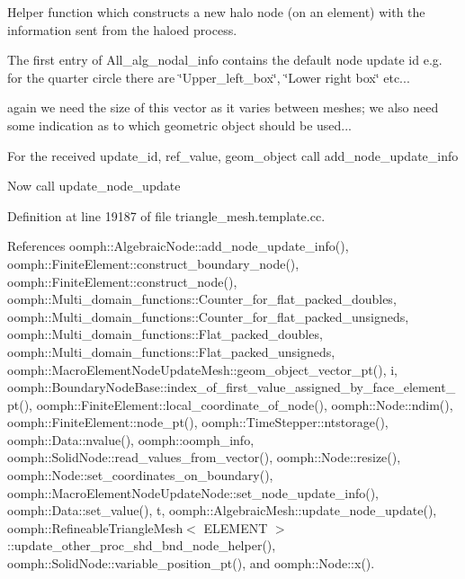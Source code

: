 Helper function which constructs a new halo node (on an element) with the information sent from the haloed process. 

The first entry of All\+\_\+alg\+\_\+nodal\+\_\+info contains the default node update id e.\+g. for the quarter circle there are \char`\"{}\+Upper\+\_\+left\+\_\+box\char`\"{}, \char`\"{}\+Lower right box\char`\"{} etc...

again we need the size of this vector as it varies between meshes; we also need some indication as to which geometric object should be used...

For the received update\+\_\+id, ref\+\_\+value, geom\+\_\+object call add\+\_\+node\+\_\+update\+\_\+info

Now call update\+\_\+node\+\_\+update 

Definition at line 19187 of file triangle\+\_\+mesh.\+template.\+cc.



References oomph\+::\+Algebraic\+Node\+::add\+\_\+node\+\_\+update\+\_\+info(), oomph\+::\+Finite\+Element\+::construct\+\_\+boundary\+\_\+node(), oomph\+::\+Finite\+Element\+::construct\+\_\+node(), oomph\+::\+Multi\+\_\+domain\+\_\+functions\+::\+Counter\+\_\+for\+\_\+flat\+\_\+packed\+\_\+doubles, oomph\+::\+Multi\+\_\+domain\+\_\+functions\+::\+Counter\+\_\+for\+\_\+flat\+\_\+packed\+\_\+unsigneds, oomph\+::\+Multi\+\_\+domain\+\_\+functions\+::\+Flat\+\_\+packed\+\_\+doubles, oomph\+::\+Multi\+\_\+domain\+\_\+functions\+::\+Flat\+\_\+packed\+\_\+unsigneds, oomph\+::\+Macro\+Element\+Node\+Update\+Mesh\+::geom\+\_\+object\+\_\+vector\+\_\+pt(), i, oomph\+::\+Boundary\+Node\+Base\+::index\+\_\+of\+\_\+first\+\_\+value\+\_\+assigned\+\_\+by\+\_\+face\+\_\+element\+\_\+pt(), oomph\+::\+Finite\+Element\+::local\+\_\+coordinate\+\_\+of\+\_\+node(), oomph\+::\+Node\+::ndim(), oomph\+::\+Finite\+Element\+::node\+\_\+pt(), oomph\+::\+Time\+Stepper\+::ntstorage(), oomph\+::\+Data\+::nvalue(), oomph\+::oomph\+\_\+info, oomph\+::\+Solid\+Node\+::read\+\_\+values\+\_\+from\+\_\+vector(), oomph\+::\+Node\+::resize(), oomph\+::\+Node\+::set\+\_\+coordinates\+\_\+on\+\_\+boundary(), oomph\+::\+Macro\+Element\+Node\+Update\+Node\+::set\+\_\+node\+\_\+update\+\_\+info(), oomph\+::\+Data\+::set\+\_\+value(), t, oomph\+::\+Algebraic\+Mesh\+::update\+\_\+node\+\_\+update(), oomph\+::\+Refineable\+Triangle\+Mesh$<$ E\+L\+E\+M\+E\+N\+T $>$\+::update\+\_\+other\+\_\+proc\+\_\+shd\+\_\+bnd\+\_\+node\+\_\+helper(), oomph\+::\+Solid\+Node\+::variable\+\_\+position\+\_\+pt(), and oomph\+::\+Node\+::x().



